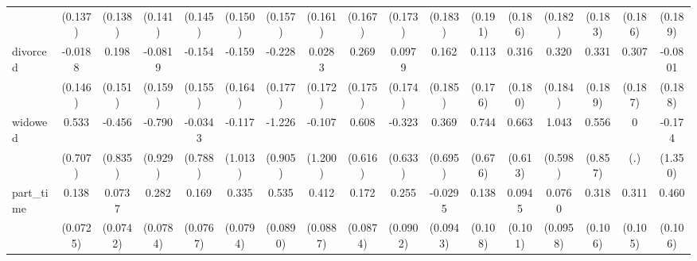 {\begin{tabular}{l*{16}{c}}
                    &     (0.137)         &     (0.138)         &     (0.141)         &     (0.145)         &     (0.150)         &     (0.157)         &     (0.161)         &     (0.167)         &     (0.173)         &     (0.183)         &     (0.191)         &     (0.186)         &     (0.182)         &     (0.183)         &     (0.186)         &     (0.189)         \\
[1em]
divorced            &     -0.0188         &       0.198         &     -0.0819         &      -0.154         &      -0.159         &      -0.228         &      0.0283         &       0.269         &      0.0979         &       0.162         &       0.113         &       0.316         &       0.320         &       0.331         &       0.307         &     -0.0801         \\
                    &     (0.146)         &     (0.151)         &     (0.159)         &     (0.155)         &     (0.164)         &     (0.177)         &     (0.172)         &     (0.175)         &     (0.174)         &     (0.185)         &     (0.176)         &     (0.180)         &     (0.184)         &     (0.189)         &     (0.187)         &     (0.188)         \\
[1em]
widowed             &       0.533         &      -0.456         &      -0.790         &     -0.0343         &      -0.117         &      -1.226         &      -0.107         &       0.608         &      -0.323         &       0.369         &       0.744         &       0.663         &       1.043         &       0.556         &           0         &      -0.174         \\
                    &     (0.707)         &     (0.835)         &     (0.929)         &     (0.788)         &     (1.013)         &     (0.905)         &     (1.200)         &     (0.616)         &     (0.633)         &     (0.695)         &     (0.676)         &     (0.613)         &     (0.598)         &     (0.857)         &         (.)         &     (1.350)         \\
[1em]
part\_time           &       0.138         &      0.0737         &       0.282\sym{***}&       0.169\sym{*}  &       0.335\sym{***}&       0.535\sym{***}&       0.412\sym{***}&       0.172\sym{*}  &       0.255\sym{**} &     -0.0295         &       0.138         &      0.0945         &      0.0760         &       0.318\sym{**} &       0.311\sym{**} &       0.460\sym{***}\\
                    &    (0.0725)         &    (0.0742)         &    (0.0784)         &    (0.0767)         &    (0.0794)         &    (0.0890)         &    (0.0887)         &    (0.0874)         &    (0.0902)         &    (0.0943)         &     (0.108)         &     (0.101)         &    (0.0958)         &     (0.106)         &     (0.105)         &     (0.106)         \\

\end{tabular}}
